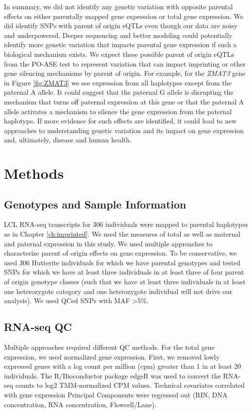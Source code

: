 In summary, we did not identify any genetic variation with opposite parental effects on either parentally mapped gene expression or total gene expression. We did identify SNPs with parent of origin eQTLs even though our data are noisy and underpowered. Deeper sequencing and better modeling could potentially identify more genetic variation that impacts parental gene expression if such a biological mechanism exists. We expect these possible parent of origin eQTLs from the PO-ASE test to represent variation that can impact imprinting or other gene silencing mechanisms by parent of origin. For example, for the \emph{ZMAT3} gene in Figure \ref{fig:ZMAT3} we see expression from all haplotypes except from the paternal A allele. It could suggest that the paternal G allele is disrupting the mechanism that turns off paternal expression at this gene or that the paternal A allele activates a mechanism to silence the gene expression from the paternal haplotype. If more evidence for such effects are identified, it could lead to new approaches to understanding genetic variation and its impact on gene expression and, ultimately, disease and human health. 

\section{Methods}\label{ch04-methods}

\subsection{Genotypes and Sample Information}\label{Genotypes and Sample Information}
LCL RNA-seq transcripts for 306 individuals were mapped to parental haplotypes as in Chapter \ref{ch:imprinted}. We used the measures of total as well as maternal and paternal expression in this study. We used multiple approaches to characterize parent of origin effects on gene expression. To be conservative, we used 306 Hutterite individuals for which we have parental genotypes and tested SNPs for which we have at least three individuals in at least three of four parent of origin genotype classes (such that we have at least three individuals in at least one heterozygote category and one heterozygote individual will not drive our analysis). We used QCed SNPs with MAF \textgreater 5\%.

\subsection{RNA-seq QC}\label{RNA-seq QC}
Multiple approaches required different QC methods. For the total gene expression, we used normalized gene expression. First, we removed lowly expressed genes with a log count per million (cpm) greater than 1 in at least 20 individuals. The R/Bioconductor package edgeR was used to convert the RNA-seq counts to log2 TMM-normalized CPM values\cite{Robinson:2010dd,Robinson:2010cw}. Technical covariates correlated with gene expression Principal Components were regressed out (RIN, DNA concentration, RNA concentration, Flowcell/Lane). 

